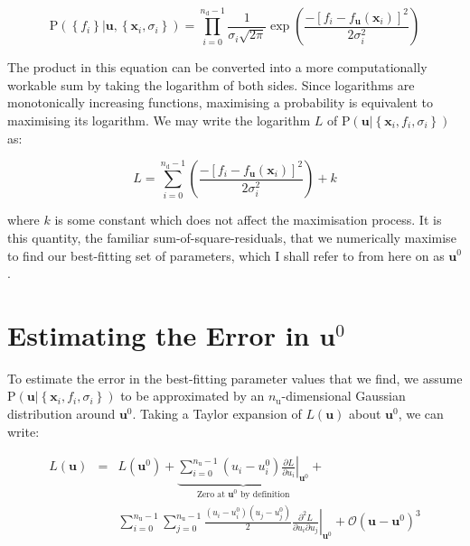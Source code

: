 \begin{equation}
\mathrm{P}\left( \left\{f_i \right\} | \mathbf{u}, \left\{ \mathbf{x}_i, \sigma_i \right\} \right)
=
\prod_{i=0}^{n_\mathrm{d}-1} \frac{1}{\sigma_i\sqrt{2\pi}} \exp \left(
\frac{
-\left[f_i - f_\mathbf{u}(\mathbf{x}_i)\right]^2
}{
2 \sigma_i^2
} \right)
\end{equation}

The product in this equation can be converted into a more computationally
workable sum by taking the logarithm of both sides. Since logarithms are
monotonically increasing functions, maximising a probability is equivalent to
maximising its logarithm. We may write the logarithm $L$ of $\mathrm{P}\left(
\mathbf{u} | \left\{ \mathbf{x}_i, f_i, \sigma_i \right\} \right)$ as:

\begin{equation}
L = \sum_{i=0}^{n_\mathrm{d}-1}
\left( \frac{
-\left[f_i - f_\mathbf{u}(\mathbf{x}_i)\right]^2
}{
2 \sigma_i^2
} \right) + k
\end{equation}

\noindent where $k$ is some constant which does not affect the maximisation
process. It is this quantity, the familiar sum-of-square-residuals, that we
numerically maximise to find our best-fitting set of parameters, which I shall
refer to from here on as $\mathbf{u}^0$.

\section{Estimating the Error in $\mathbf{u}^0$}

To estimate the error in the best-fitting parameter values that we find, we
assume $\mathrm{P}\left( \mathbf{u} | \left\{ \mathbf{x}_i, f_i, \sigma_i
\right\} \right)$ to be approximated by an $n_\mathrm{u}$-dimensional Gaussian
distribution around $\mathbf{u}^0$. Taking a Taylor expansion of
$L(\mathbf{u})$ about $\mathbf{u}^0$, we can write:

\begin{eqnarray}
L(\mathbf{u}) & = & L(\mathbf{u}^0) +
    \underbrace{
      \sum_{i=0}^{n_\mathrm{u}-1} \left( u_i - u^0_i \right)
      \left.\frac{\partial L}{\partial u_i}\right|_{\mathbf{u}^0}
    }_{\textrm{Zero at $\mathbf{u}^0$ by definition}} + \label{eqa:L_taylor_expand}\\
& & \sum_{i=0}^{n_\mathrm{u}-1} \sum_{j=0}^{n_\mathrm{u}-1} \frac{\left( u_i - u^0_i \right) \left( u_j - u^0_j \right)}{2}
    \left.\frac{\partial^2 L}{\partial u_i \partial u_j}\right|_{\mathbf{u}^0} +
    \mathcal{O}\left( \mathbf{u} - \mathbf{u}^0\right)^3 \nonumber
\end{eqnarray}

